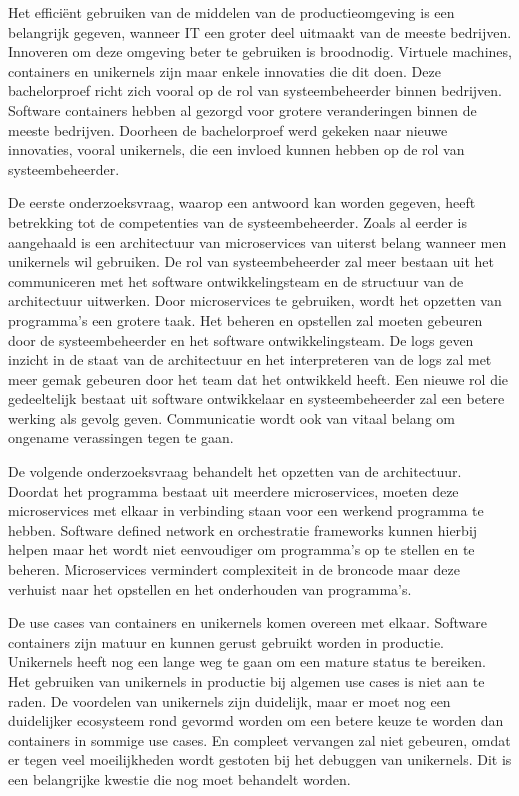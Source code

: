 \documentclass[pdftex,a4paper,12pt,twoside]{report}
\begin{document}
Het efficiënt gebruiken van de middelen van de productieomgeving is een belangrijk gegeven, wanneer IT een groter deel uitmaakt van de meeste bedrijven. Innoveren om deze omgeving beter te gebruiken is broodnodig. Virtuele machines, containers en unikernels zijn maar enkele innovaties die dit doen. Deze bachelorproef richt zich vooral op de rol van systeembeheerder binnen bedrijven. Software containers hebben al gezorgd voor grotere veranderingen binnen de meeste bedrijven. Doorheen de bachelorproef werd gekeken naar nieuwe innovaties, vooral unikernels, die een invloed kunnen hebben op de rol van systeembeheerder.

De eerste onderzoeksvraag, waarop een antwoord kan worden gegeven, heeft betrekking tot de competenties van de systeembeheerder. Zoals al eerder is aangehaald is een architectuur van microservices van uiterst belang wanneer men unikernels wil gebruiken. De rol van systeembeheerder zal meer bestaan uit het communiceren met het software ontwikkelingsteam en de structuur van de architectuur uitwerken. Door microservices te gebruiken, wordt het opzetten van programma's een grotere taak. Het beheren en opstellen zal moeten gebeuren door de systeembeheerder en het software ontwikkelingsteam. De logs geven inzicht in de staat van de architectuur en het interpreteren van de logs zal met meer gemak gebeuren door het team dat het ontwikkeld heeft. Een nieuwe rol die gedeeltelijk bestaat uit software ontwikkelaar en systeembeheerder zal een betere werking als gevolg geven. Communicatie wordt ook van vitaal belang om ongename verassingen tegen te gaan.

De volgende onderzoeksvraag behandelt het opzetten van de architectuur. Doordat het programma bestaat uit meerdere microservices, moeten deze microservices met elkaar in verbinding staan voor een werkend programma te hebben. Software defined network en orchestratie frameworks kunnen hierbij helpen maar het wordt niet eenvoudiger om programma's op te stellen en te beheren. Microservices vermindert complexiteit in de broncode maar deze verhuist naar het opstellen en het onderhouden van programma's.

De use cases van containers en unikernels komen overeen met elkaar. Software containers zijn matuur en kunnen gerust gebruikt worden in productie. Unikernels heeft nog een lange weg te gaan om een mature status te bereiken. Het gebruiken van unikernels in productie bij algemen use cases is niet aan te raden. De voordelen van unikernels zijn duidelijk, maar er moet nog een duidelijker ecosysteem rond gevormd worden om een betere keuze te worden dan containers in sommige use cases. En compleet vervangen zal niet gebeuren, omdat er tegen veel moeilijkheden wordt gestoten bij het debuggen van unikernels. Dit is een belangrijke kwestie die nog moet behandelt worden.
\end{document}
